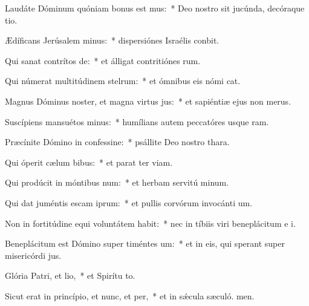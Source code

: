\item Laudáte Dóminum quóniam bonus est mus:~* Deo nostro sit jucúnda, decóraque tio.
\item Ædíficans Jerúsalem minus:~* dispersiónes Israélis conbit.
\item Qui sanat contrítos de:~* et álligat contritiónes rum.
\item Qui númerat multitúdinem stelrum:~* et ómnibus eis nómi cat.
\item Magnus Dóminus noster, et magna virtus jus:~* et sapiéntiæ ejus non  merus.
\item Suscípiens mansuétos minus:~* humílians autem peccatóres usque  ram.
\item Præcínite Dómino in confessine:~* psállite Deo nostro  thara.
\item Qui óperit cælum bibus:~* et parat ter viam.
\item Qui prodúcit in móntibus num:~* et herbam servitú minum.
\item Qui dat juméntis escam iprum:~* et pullis corvórum invocánti um.
\item Non in fortitúdine equi voluntátem habit:~* nec in tíbiis viri beneplácitum e i.
\item Beneplácitum est Dómino super timéntes um:~* et in eis, qui sperant super misericórdi jus.
\item Glória Patri, et lio,~* et Spirítu to.
\item Sicut erat in princípio, et nunc, et per,~* et in sǽcula sæculó. men.
